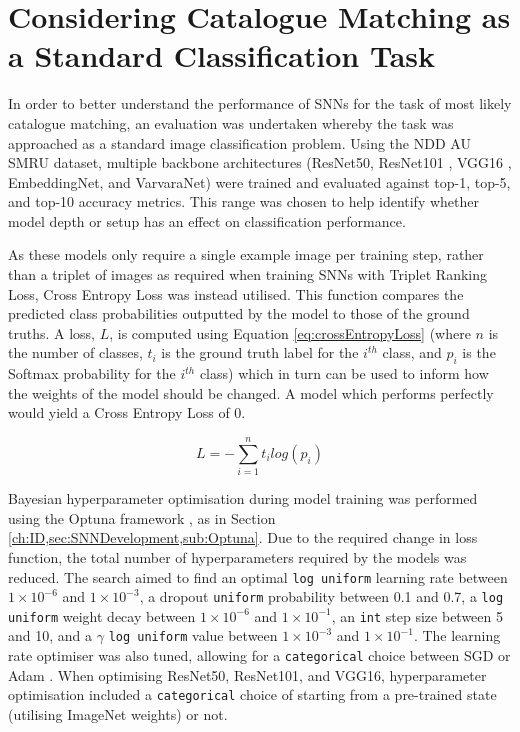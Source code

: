 \section{Considering Catalogue Matching as a Standard Classification Task}\label{ch:SNNEvaluation,sec:comparsion}

In order to better understand the performance of SNNs for the task of most likely catalogue matching, an evaluation was undertaken whereby the task was approached as a standard image classification problem. Using the NDD AU SMRU dataset, multiple backbone architectures (ResNet50, ResNet101 \cite{he_deep_2015}, VGG16 \cite{simonyan_very_2015}, EmbeddingNet, and VarvaraNet) were trained and evaluated against top-1, top-5, and top-10 accuracy metrics. This range was chosen to help identify whether model depth or setup has an effect on classification performance. 

As these models only require a single example image per training step, rather than a triplet of images as required when training SNNs with Triplet Ranking Loss, Cross Entropy Loss was instead utilised. This function compares the predicted class probabilities outputted by the model to those of the ground truths. A loss, $L$, is computed using Equation \ref{eq:crossEntropyLoss} (where $n$ is the number of classes, $t_{i}$ is the ground truth label for the $i^{th}$ class, and $p_{i}$ is the Softmax probability for the $i^{th}$ class) which in turn can be used to inform how the weights of the model should be changed. A model which performs perfectly would yield a Cross Entropy Loss of 0. 

\begin{equation}
	\label{eq:crossEntropyLoss}
	L = -\sum_{i=1}^{n} t_{i} log(p_{i})
\end{equation}

Bayesian hyperparameter optimisation during model training was performed using the Optuna framework \cite{akiba_optuna_2019}, as in Section \ref{ch:ID,sec:SNNDevelopment,sub:Optuna}. Due to the required change in loss function, the total number of hyperparameters required by the models was reduced. The search aimed to find an optimal \texttt{log uniform} learning rate between $1\times10^{-6}$ and $1\times10^{-3}$, a dropout \cite{srivastava_dropout:_2014} \texttt{uniform} probability between 0.1 and 0.7, a \texttt{log uniform} weight decay between $1\times10^{-6}$ and $1\times10^{-1}$, an \texttt{int} step size between 5 and 10, and a $\gamma$ \texttt{log uniform} value between $1\times10^{-3}$ and $1\times10^{-1}$. The learning rate optimiser was also tuned, allowing for a \texttt{categorical} choice between SGD or Adam \cite{kingma_adam:_2014}. When optimising ResNet50, ResNet101, and VGG16, hyperparameter optimisation included a \texttt{categorical} choice of starting from a pre-trained state (utilising ImageNet \cite{krizhevsky_learning_2009} weights) or not.

